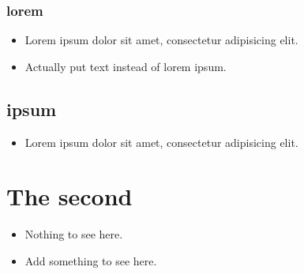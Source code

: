 \subsection{lorem}  %
\label{autosec:4}
    \begin{itemize}[noitemsep]
        \item Lorem ipsum dolor sit amet, consectetur adipisicing elit.  %
        \item {\color{red}Actually put text instead of lorem ipsum.}  %
    \end{itemize}
\section{ipsum}  %
\label{autosec:5}
    \begin{itemize}[noitemsep]
        \item Lorem ipsum dolor sit amet, consectetur adipisicing elit.  %
    \end{itemize}
\chapter{The second}  %
\label{autosec:6}
    \begin{itemize}[noitemsep]
        \item Nothing to see here.  %
        \item {\color{red}Add something to see here.}  %
    \end{itemize}

